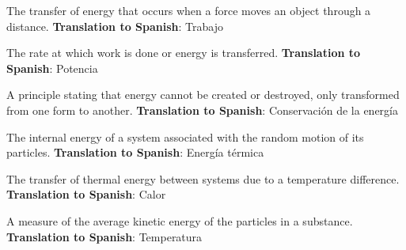 \begin{vocabulary}[Work]
The transfer of energy that occurs when a force moves an object through a distance. \newline
\textbf{Translation to Spanish}: Trabajo \newline
\end{vocabulary}


\begin{vocabulary}[Power]
The rate at which work is done or energy is transferred. \newline
\textbf{Translation to Spanish}: Potencia \newline
\end{vocabulary}


\begin{vocabulary}
A principle stating that energy cannot be created or destroyed, only transformed from one form to another. \newline
\textbf{Translation to Spanish}: Conservación de la energía \newline
\end{vocabulary}


\begin{vocabulary}
The internal energy of a system associated with the random motion of its particles. \newline
\textbf{Translation to Spanish}: Energía térmica \newline
\end{vocabulary}


\begin{vocabulary}[Heat]
The transfer of thermal energy between systems due to a temperature difference. \newline
\textbf{Translation to Spanish}: Calor \newline
\end{vocabulary}


\begin{vocabulary}[Temperature]
A measure of the average kinetic energy of the particles in a substance. \newline
\textbf{Translation to Spanish}: Temperatura \newline
\end{vocabulary}

